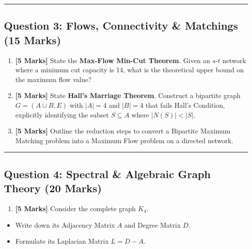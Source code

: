 \documentclass[
]{book}
\providecommand{\tightlist}{%
  \setlength{\itemsep}{0pt}\setlength{\parskip}{0pt}}
\theoremstyle{definition}
\theoremstyle{definition}
\theoremstyle{definition}
\theoremstyle{definition}
\theoremstyle{remark}
\begin{document}
\begin{center}\rule{0.5\linewidth}{0.5pt}\end{center}

\subsection{Question 3: Flows, Connectivity \& Matchings (15 Marks)}\label{question-3-flows-connectivity-matchings-15-marks}

\begin{enumerate}
\def\labelenumi{\arabic{enumi}.}
\tightlist
\item
  \textbf{{[}5 Marks{]}} State the \textbf{Max-Flow Min-Cut Theorem}. Given an \(s\)-\(t\) network where a minimum cut capacity is 14, what is the theoretical upper bound on the maximum flow value?
\item
  \textbf{{[}5 Marks{]}} State \textbf{Hall's Marriage Theorem}. Construct a bipartite graph \(G = (A \cup B, E)\) with \(\vert{}A\vert{} = 4\) and \(\vert{}B\vert{} = 4\) that fails Hall's Condition, explicitly identifying the subset \(S \subseteq A\) where \(\vert{}N(S)\vert{} < \vert{}S\vert{}\).
\item
  \textbf{{[}5 Marks{]}} Outline the reduction steps to convert a Bipartite Maximum Matching problem into a Maximum Flow problem on a directed network.
\end{enumerate}

\begin{center}\rule{0.5\linewidth}{0.5pt}\end{center}

\subsection{Question 4: Spectral \& Algebraic Graph Theory (20 Marks)}\label{question-4-spectral-algebraic-graph-theory-20-marks}

\begin{enumerate}
\def\labelenumi{\arabic{enumi}.}
\tightlist
\item
  \textbf{{[}5 Marks{]}} Consider the complete graph \(K_4\).
\end{enumerate}

\begin{itemize}
\tightlist
\item
  Write down its Adjacency Matrix \(A\) and Degree Matrix \(D\).
\item
  Formulate its Laplacian Matrix \(L = D - A\).
\end{itemize}
\end{document}
